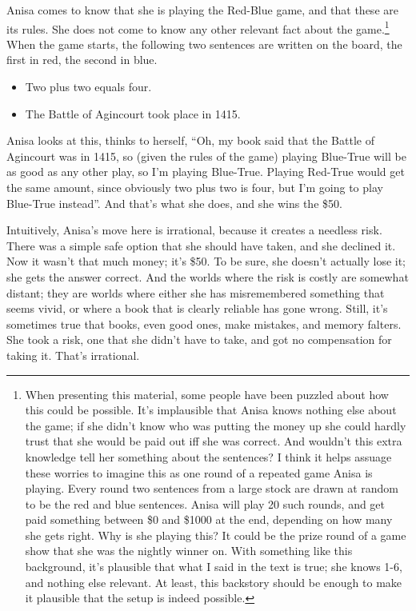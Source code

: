 \documentclass[
  12pt,
  letterpaper,
]{scrbook}
\providecommand{\tightlist}{%
  \setlength{\itemsep}{0pt}\setlength{\parskip}{0pt}}\usepackage{longtable,booktabs,array}
\begin{document}
Anisa comes to know that she is playing the Red-Blue game, and that
these are its rules. She does not come to know any other relevant fact
about the game.\footnote{When presenting this material, some people have
  been puzzled about how this could be possible. It's implausible that
  Anisa knows nothing else about the game; if she didn't know who was
  putting the money up she could hardly trust that she would be paid out
  iff she was correct. And wouldn't this extra knowledge tell her
  something about the sentences? I think it helps assuage these worries
  to imagine this as one round of a repeated game Anisa is playing.
  Every round two sentences from a large stock are drawn at random to be
  the red and blue sentences. Anisa will play 20 such rounds, and get
  paid something between \$0 and \$1000 at the end, depending on how
  many she gets right. Why is she playing this? It could be the prize
  round of a game show that she was the nightly winner on. With
  something like this background, it's plausible that what I said in the
  text is true; she knows 1-6, and nothing else relevant. At least, this
  backstory should be enough to make it plausible that the setup is
  indeed possible.} When the game starts, the following two sentences
are written on the board, the first in red, the second in blue.

\begin{itemize}
\tightlist
\item
  Two plus two equals four.
\item
  The Battle of Agincourt took place in 1415.
\end{itemize}

Anisa looks at this, thinks to herself, ``Oh, my book said that the
Battle of Agincourt was in 1415, so (given the rules of the game)
playing Blue-True will be as good as any other play, so I'm playing
Blue-True. Playing Red-True would get the same amount, since obviously
two plus two is four, but I'm going to play Blue-True instead''. And
that's what she does, and she wins the \$50.

Intuitively, Anisa's move here is irrational, because it creates a
needless risk. There was a simple safe option that she should have
taken, and she declined it. Now it wasn't that much money; it's \$50. To
be sure, she doesn't actually lose it; she gets the answer correct. And
the worlds where the risk is costly are somewhat distant; they are
worlds where either she has misremembered something that seems vivid, or
where a book that is clearly reliable has gone wrong. Still, it's
sometimes true that books, even good ones, make mistakes, and memory
falters. She took a risk, one that she didn't have to take, and got no
compensation for taking it. That's irrational.
\end{document}
